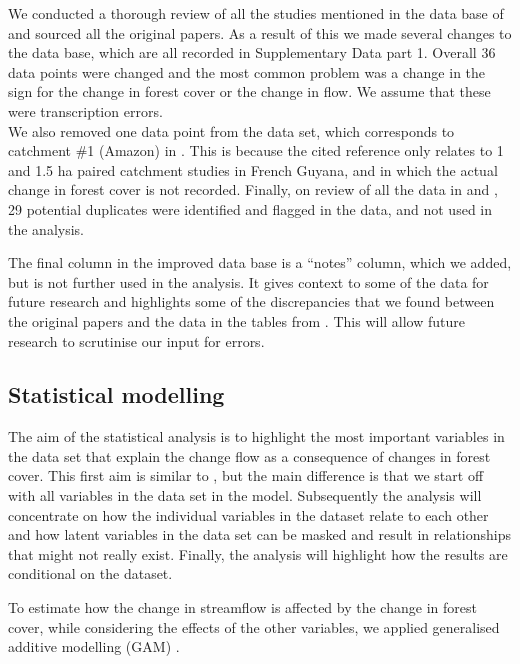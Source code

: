 \documentclass[]{elsarticle} %
\begin{document}
We conducted a thorough review of all the studies mentioned in the data base of \citet{zhang2017} and sourced all the original papers. As a result of this we made several changes to the data base, which are all recorded in Supplementary Data part 1. Overall 36 data points were changed and the most common problem was a change in the sign for the change in forest cover or the change in flow. We assume that these were transcription errors.\\
We also removed one data point from the data set, which corresponds to catchment \#1 (Amazon) in \citet{zhang2017}. This is because the cited reference \citep{roche1981} only relates to 1 and 1.5 ha paired catchment studies in French Guyana, and in which the actual change in forest cover is not recorded. Finally, on review of all the data in \citet{zhang2017} and \citet{filoso2017}, 29 potential duplicates were identified and flagged in the data, and not used in the analysis.

The final column in the improved data base is a ``notes'' column, which we added, but is not further used in the analysis. It gives context to some of the data for future research and highlights some of the discrepancies that we found between the original papers and the data in the tables from \citet{zhang2017}. This will allow future research to scrutinise our input for errors.

\hypertarget{statistical-modelling}{%
\subsection{Statistical modelling}\label{statistical-modelling}}

The aim of the statistical analysis is to highlight the most important variables in the data set that explain the change flow as a consequence of changes in forest cover. This first aim is similar to \citet{zhang2017}, but the main difference is that we start off with all variables in the data set in the model. Subsequently the analysis will concentrate on how the individual variables in the dataset relate to each other and how latent variables in the data set can be masked and result in relationships that might not really exist. Finally, the analysis will highlight how the results are conditional on the dataset.

To estimate how the change in streamflow is affected by the change in forest cover, while considering the effects of the other variables, we applied generalised additive modelling (GAM) \citep{wood2006}.
\end{document}
